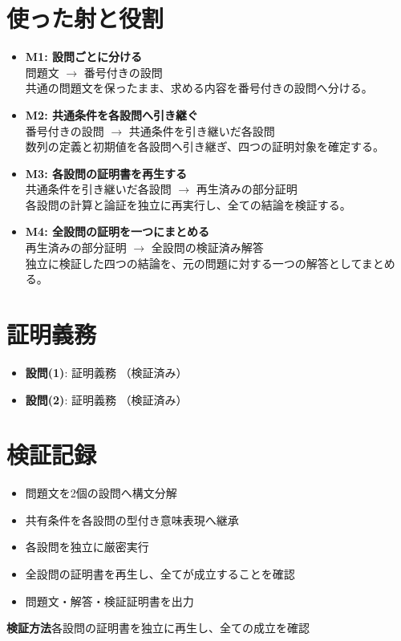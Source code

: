 \documentclass[uplatex,dvipdfmx,11pt]{jsarticle}
\begin{document}
\section*{使った射と役割}
\begin{itemize}
\item \textbf{M1: 設問ごとに分ける}\\
問題文
$\longrightarrow$
番号付きの設問\\
共通の問題文を保ったまま、求める内容を番号付きの設問へ分ける。
\item \textbf{M2: 共通条件を各設問へ引き継ぐ}\\
番号付きの設問
$\longrightarrow$
共通条件を引き継いだ各設問\\
数列の定義と初期値を各設問へ引き継ぎ、四つの証明対象を確定する。
\item \textbf{M3: 各設問の証明書を再生する}\\
共通条件を引き継いだ各設問
$\longrightarrow$
再生済みの部分証明\\
各設問の計算と論証を独立に再実行し、全ての結論を検証する。
\item \textbf{M4: 全設問の証明を一つにまとめる}\\
再生済みの部分証明
$\longrightarrow$
全設問の検証済み解答\\
独立に検証した四つの結論を、元の問題に対する一つの解答としてまとめる。
\end{itemize}


\section*{証明義務}
\begin{itemize}
\item \textbf{設問(1)}: 証明義務 （検証済み）
\item \textbf{設問(2)}: 証明義務 （検証済み）
\end{itemize}


\section*{検証記録}
\begin{itemize}
\item 問題文を2個の設問へ構文分解
\item 共有条件を各設問の型付き意味表現へ継承
\item 各設問を独立に厳密実行
\item 全設問の証明書を再生し、全てが成立することを確認
\item 問題文・解答・検証証明書を出力
\end{itemize}
\noindent\textbf{検証方法}\quad 各設問の証明書を独立に再生し、全ての成立を確認
\par{}
\end{document}
